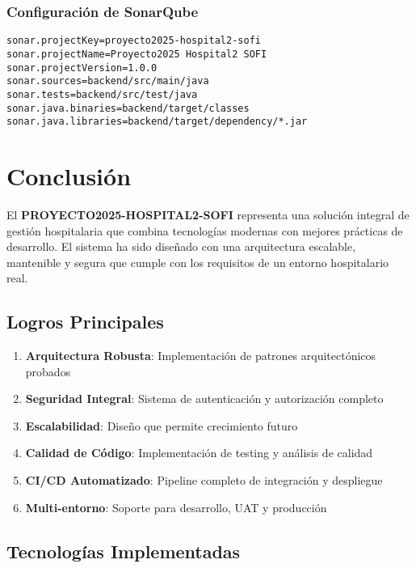 \documentclass[12pt,a4paper]{article}
\begin{document}
\subsubsection{Configuración de SonarQube}
\begin{lstlisting}[language=properties]
sonar.projectKey=proyecto2025-hospital2-sofi
sonar.projectName=Proyecto2025 Hospital2 SOFI
sonar.projectVersion=1.0.0
sonar.sources=backend/src/main/java
sonar.tests=backend/src/test/java
sonar.java.binaries=backend/target/classes
sonar.java.libraries=backend/target/dependency/*.jar
\end{lstlisting}

\section{Conclusión}

El \textbf{PROYECTO2025-HOSPITAL2-SOFI} representa una solución integral de gestión hospitalaria que combina tecnologías modernas con mejores prácticas de desarrollo. El sistema ha sido diseñado con una arquitectura escalable, mantenible y segura que cumple con los requisitos de un entorno hospitalario real.

\subsection{Logros Principales}

\begin{enumerate}
    \item \textbf{Arquitectura Robusta}: Implementación de patrones arquitectónicos probados
    \item \textbf{Seguridad Integral}: Sistema de autenticación y autorización completo
    \item \textbf{Escalabilidad}: Diseño que permite crecimiento futuro
    \item \textbf{Calidad de Código}: Implementación de testing y análisis de calidad
    \item \textbf{CI/CD Automatizado}: Pipeline completo de integración y despliegue
    \item \textbf{Multi-entorno}: Soporte para desarrollo, UAT y producción
\end{enumerate}

\subsection{Tecnologías Implementadas}
\end{document}
